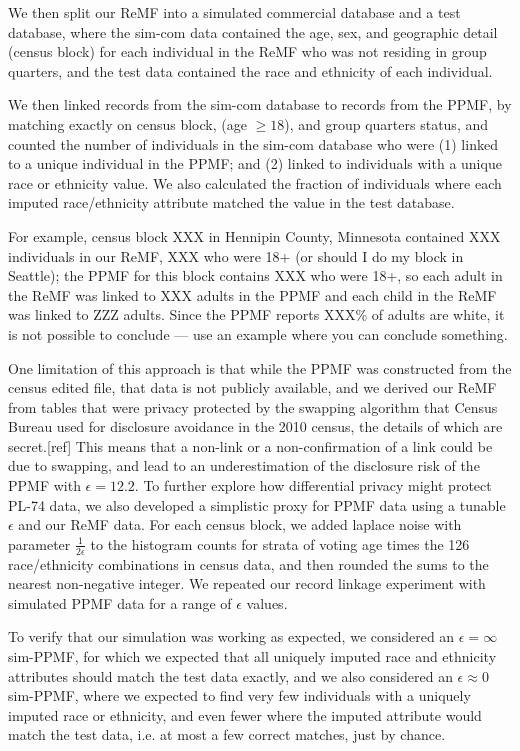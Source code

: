 \documentclass{article}
\begin{document}
We then split our ReMF into a simulated commercial database and a test database, where the sim-com data contained the age, sex, and geographic detail (census block) for each individual in the ReMF who was not residing in group quarters, and the test data contained the race and ethnicity of each individual.

We then linked records from the sim-com database to records from the PPMF, by matching exactly on census block, (age $\geq 18$), and group quarters status, and counted the number of individuals in the sim-com database who were (1) linked to a unique individual in the PPMF; and (2) linked to individuals with a unique race or ethnicity value.  We also calculated the fraction of individuals where each imputed race/ethnicity attribute matched the value in the test database.

For example, census block XXX in Hennipin County, Minnesota contained XXX individuals in our ReMF, XXX who were 18+ (or should I do my block in Seattle); the PPMF for this block contains XXX who were 18+, so each adult in the ReMF was linked to XXX adults in the PPMF and each child in the ReMF was linked to ZZZ adults.  Since the PPMF reports XXX\% of adults are white, it is not possible to conclude --- use an example where you can conclude something.

One limitation of this approach is that while the PPMF was constructed from the census edited file, that data is not publicly available, and we derived our ReMF from tables that were privacy protected by the swapping algorithm that Census Bureau used for disclosure avoidance in the 2010 census, the details of which are secret.[ref]  This means that a non-link or a non-confirmation of a link could be due to swapping, and lead to an underestimation of the disclosure risk of the PPMF with $\epsilon=12.2$.  To further explore how differential privacy might protect PL-74 data, we also developed a simplistic proxy for PPMF data using a tunable $\epsilon$ and our ReMF data.  For each census block, we added laplace noise with parameter $\frac{1}{2\epsilon}$ to the histogram counts for strata of voting age times the 126 race/ethnicity combinations in census data, and then rounded the sums to the nearest non-negative integer.  We repeated our record linkage experiment with simulated PPMF data for a range of $\epsilon$ values.

To verify that our simulation was working as expected, we considered an $\epsilon=\infty$ sim-PPMF, for which we expected that all uniquely imputed race and ethnicity attributes should match the test data exactly, and we also considered an $\epsilon\approx0$ sim-PPMF, where we expected to find very few individuals with a uniquely imputed race or ethnicity, and even fewer where the imputed attribute would match the test data, i.e. at most a few correct matches, just by chance.
\end{document}
